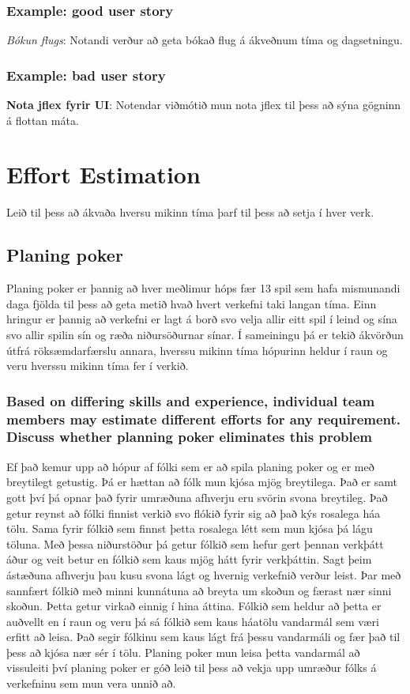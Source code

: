 \documentclass[openany]{article}
\begin{document}
\subsubsection{Example: good user story}
\textit{Bókun flugs}: Notandi verður að geta bókað flug á ákveðnum tíma og dagsetningu.
\subsubsection{Example: bad user story}
\textbf{Nota jflex fyrir UI}: Notendar viðmótið mun nota jflex til þess að sýna gögninn á flottan máta.
\section{Effort Estimation}
Leið til þess að ákvaða hversu mikinn tíma þarf til þess að setja í hver verk.
\subsection{Planing poker}
Planing poker er þannig að hver meðlimur hóps fær 13 spil sem hafa mismunandi daga fjölda til þess að geta metið hvað hvert verkefni taki langan tíma. Einn hringur er þannig að verkefni er lagt á borð svo velja allir eitt spil í leind og sína svo allir spilin sín og ræða niðursöðurnar sínar. Í sameiningu þá er tekið ákvörðun útfrá röksæmdarfærslu annara, hverssu mikinn tíma hópurinn heldur í raun og veru hverssu mikinn tíma fer í verkið.
\subsubsection{Based on differing skills and experience, individual team members may estimate different efforts for any requirement. Discuss whether planning poker eliminates this problem}
Ef það kemur upp að hópur af fólki sem er að spila planing poker og er með breytilegt getustig. Þá er hættan að fólk mun kjósa mjög breytilega. Það er samt gott því þá opnar það fyrir umræðuna afhverju eru svörin svona breytileg. Það getur reynst að fólki finnist verkið svo flókið fyrir sig að það kýs rosalega háa tölu. Sama fyrir fólkið sem finnst þetta rosalega létt sem mun kjósa þá lágu töluna. Með þessa niðurstöður þá getur fólkið sem hefur gert þennan verkþátt áður og veit betur en fólkið sem kaus mjög hátt fyrir verkþáttin. Sagt þeim ástæðuna afhverju þau kusu svona lágt og hvernig verkefnið verður leist. Þar með sannfært fólkið með minni kunnátuna að breyta um skoðun og færast nær sinni skoðun. Þetta getur virkað einnig í hina áttina. Fólkið sem heldur að þetta er auðvellt en í raun og veru þá sá fólkið sem kaus háatölu vandarmál sem væri erfitt að leisa. Það segir fólkinu sem kaus lágt frá þessu vandarmáli og fær það til þess að kjósa nær sér í tölu. Planing poker mun leisa þetta vandarmál að vissuleiti því planing poker er góð leið til þess að vekja upp umræður fólks á verkefninu sem mun vera unnið að.
\end{document}
